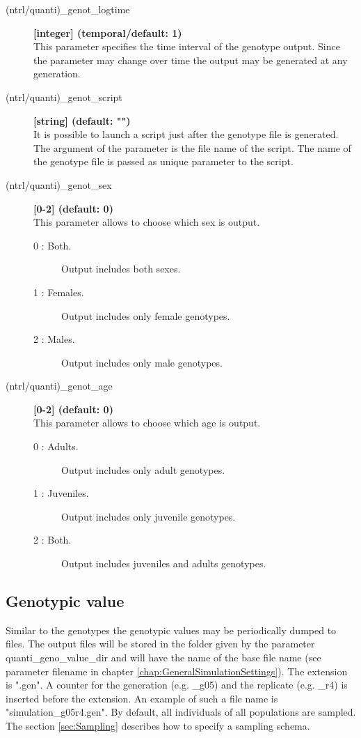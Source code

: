\documentclass[letterpaper,12pt,oneside]{book}
\begin{document}
\begin{description}
\item[(ntrl/quanti)\_genot\_logtime] \textbf{[integer] (temporal/default: 1)}\\
This parameter specifies the time interval of the genotype output. Since the parameter may change over time the output may be generated at any generation.

\item[(ntrl/quanti)\_genot\_script] \textbf{[string] (default: "")}\\
It is possible to launch a script just after the genotype file is generated. The argument of the parameter is the file name of the script. The name of the genotype file is passed as unique parameter to the script. 

\item[(ntrl/quanti)\_genot\_sex] \textbf{[0-2] (default: 0)}\\
This parameter allows to choose which sex is output. 
\begin{description}
\item [0 : Both.] Output includes both sexes.
\item [1 : Females.] Output includes only female genotypes.
\item [2 : Males.] Output includes only male genotypes.
\end{description}

\item[(ntrl/quanti)\_genot\_age] \textbf{[0-2] (default: 0)}\\
This parameter allows to choose which age is output.  
\begin{description}
\item [0 : Adults.] Output includes only adult genotypes.
\item [1 : Juveniles.] Output includes only juvenile genotypes.
\item [2 : Both.] Output includes juveniles and adults genotypes.
\end{description}
\end{description}



\subsection{Genotypic value}\label{genoValQuanti}
Similar to the genotypes the genotypic values may be periodically dumped to files. The output files will be stored in the folder given by the parameter \textsf{quanti\_geno\_value\_dir} and will have the name of the base file name (see parameter \textsf{filename} in chapter \ref{chap:GeneralSimulationSettings}). The extension is ".gen". A counter for the generation (e.g. \_g05) and the replicate (e.g. \_r4) is inserted before the extension. An example of such a file name is \textsf{"simulation\_g05r4.gen"}. By default, all individuals of all populations are sampled. The section \ref{sec:Sampling} describes how to specify a sampling schema.
\end{document}
